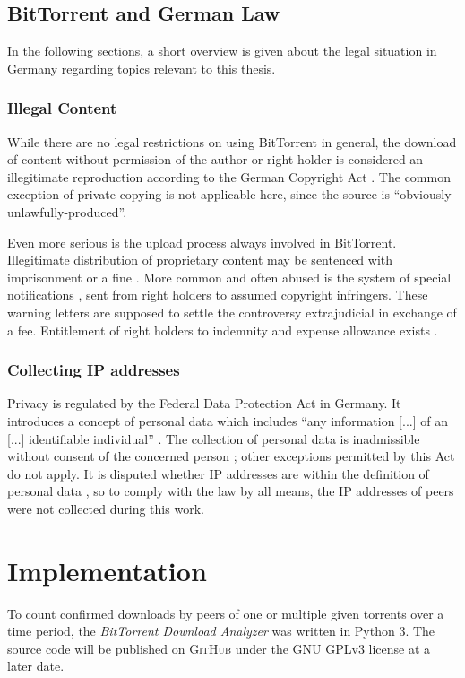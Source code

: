 \documentclass[10pt, a4paper, twoside, headsepline]{scrbook}
\renewcommand{\_}{\origunderscore\allowbreak}
\begin{document}
\section{BitTorrent and German Law}
\label{law}
In the following sections, a short overview is given about the legal situation in Germany regarding topics relevant to this thesis.

\subsection{Illegal Content}
While there are no legal restrictions on using BitTorrent in general, the download of content without permission of the author or right holder is considered an illegitimate reproduction according to the German Copyright Act \cite[art.~15\,(1),~16]{urhg}. The common exception of private copying \cite[art.~53]{urhg} is not applicable here, since the source is ``obviously unlawfully-produced''.

Even more serious is the upload process always involved in BitTorrent. Illegitimate distribution of proprietary content may be sentenced with imprisonment or a fine \cite[art.~106]{urhg}. More common and often abused \cite{abmahnung} is the system of special notifications \cite[art.~97a]{urhg}, sent from right holders to assumed copyright infringers. These warning letters are supposed to settle the controversy extrajudicial in exchange of a fee. Entitlement of right holders to indemnity and expense allowance exists \cite[art.~97]{urhg}.

\subsection{Collecting IP addresses}
Privacy is regulated by the Federal Data Protection Act \cite{bdsg} in Germany. It introduces a concept of personal data which includes ``any information [...] of an [...] identifiable individual'' \cite[sec.~3\,(1)]{bdsg}. The collection of personal data is inadmissible without consent of the concerned person \cite[sec.~4]{bdsg}; other exceptions permitted by this Act do not apply. It is disputed whether IP addresses are within the definition of personal data \cite{ip}, so to comply with the law by all means, the IP addresses of peers were not collected during this work.

\chapter{Implementation}
To count confirmed downloads by peers of one or multiple given torrents over a time period, the \emph{BitTorrent Download Analyzer} was written in Python 3. The source code will be published \cite{btda} on \textsc{GitHub} under the GNU GPLv3 license at a later date.
\end{document}
